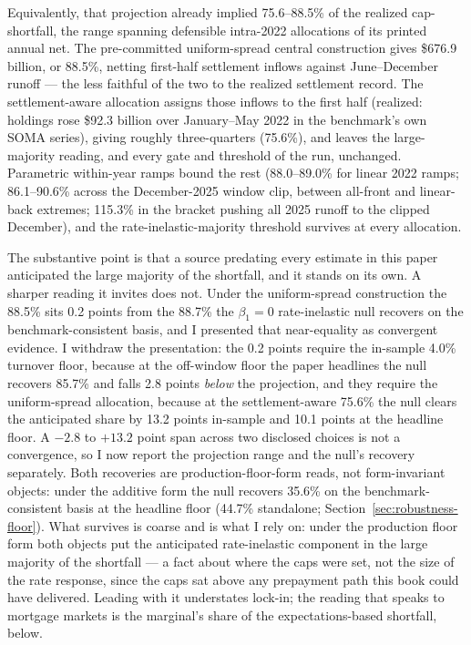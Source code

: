 Equivalently, that projection already implied 75.6--88.5\% of the realized cap-shortfall, the range spanning defensible intra-2022 allocations of its printed annual net. The pre-committed uniform-spread central construction gives \$676.9 billion, or 88.5\%, netting first-half settlement inflows against June--December runoff --- the less faithful of the two to the realized settlement record. The settlement-aware allocation assigns those inflows to the first half (realized: holdings rose \$92.3 billion over January--May 2022 in the benchmark's own SOMA series), giving roughly three-quarters (75.6\%), and leaves the large-majority reading, and every gate and threshold of the run, unchanged. Parametric within-year ramps bound the rest (88.0--89.0\% for linear 2022 ramps; 86.1--90.6\% across the December-2025 window clip, between all-front and linear-back extremes; 115.3\% in the bracket pushing all 2025 runoff to the clipped December), and the rate-inelastic-majority threshold survives at every allocation.

The substantive point is that a source predating every estimate in this paper anticipated the large majority of the shortfall, and it stands on its own. A sharper reading it invites does not. Under the uniform-spread construction the 88.5\% sits 0.2 points from the 88.7\% the $\beta_1 = 0$ rate-inelastic null recovers on the benchmark-consistent basis, and I presented that near-equality as convergent evidence. I withdraw the presentation: the 0.2 points require the in-sample 4.0\% turnover floor, because at the off-window floor the paper headlines the null recovers 85.7\% and falls 2.8 points \emph{below} the projection, and they require the uniform-spread allocation, because at the settlement-aware 75.6\% the null clears the anticipated share by 13.2 points in-sample and 10.1 points at the headline floor. A $-2.8$ to $+13.2$ point span across two disclosed choices is not a convergence, so I now report the projection range and the null's recovery separately. Both recoveries are production-floor-form reads, not form-invariant objects: under the additive form the null recovers 35.6\% on the benchmark-consistent basis at the headline floor (44.7\% standalone; Section~\ref{sec:robustness-floor}). What survives is coarse and is what I rely on: under the production floor form both objects put the anticipated rate-inelastic component in the large majority of the shortfall --- a fact about where the caps were set, not the size of the rate response, since the caps sat above any prepayment path this book could have delivered. Leading with it understates lock-in; the reading that speaks to mortgage markets is the marginal's share of the expectations-based shortfall, below.

